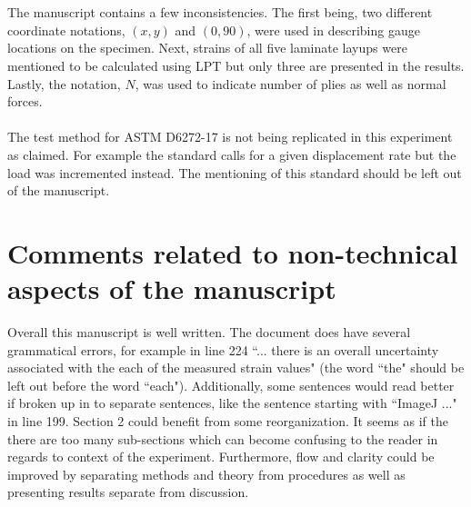\documentclass[12pt]{article}
\begin{document}
\\
\\
The manuscript contains a few inconsistencies. The first being, two different coordinate notations, $(x,y)$ and $(0,90)$, were used in describing  gauge locations on the specimen. Next, strains of all five laminate layups were mentioned to be calculated using LPT but only three are presented in the results. Lastly, the notation, $N$, was used to indicate number of plies as well as normal forces.
\\
\\
The test method for ASTM D6272-17 is not being replicated in this experiment as claimed. For example the standard calls for a given displacement rate but the load was incremented instead. The mentioning of this standard should be left out of the manuscript.  
\section*{Comments related to non-technical aspects of the manuscript} 
Overall this manuscript is well written. The document does have several grammatical errors, for example in line 224 ``... there is an overall uncertainty associated with the each of the measured strain values" (the word ``the" should be left out before the word ``each"). Additionally, some sentences would read better if broken up in to separate sentences, like the sentence starting with ``ImageJ ..." in line 199. 
Section 2 could benefit from some reorganization. It seems as if the there are too many sub-sections which can become confusing to the reader in regards to context of the experiment.  Furthermore, flow and clarity could be improved by separating methods and theory from procedures as well as presenting results separate from discussion.
\end{document}
